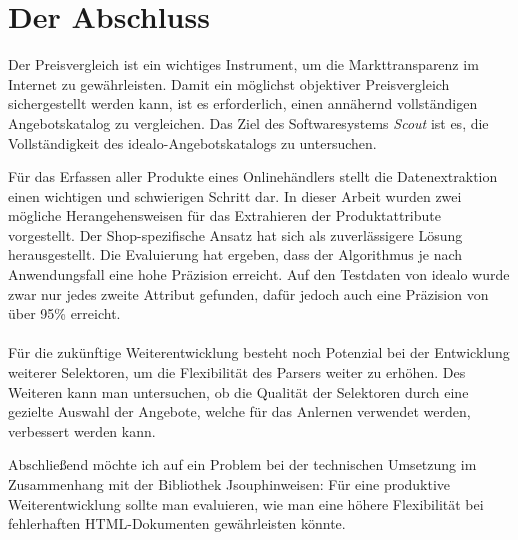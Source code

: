 \section{Der Abschluss}
\label{sec:abschluss}

Der Preisvergleich ist ein wichtiges Instrument, um die Markttransparenz im Internet zu gewährleisten.
Damit ein möglichst objektiver Preisvergleich sichergestellt werden kann, ist es erforderlich, einen annähernd
vollständigen Angebotskatalog zu vergleichen.
Das Ziel des Softwaresystems \textit{Scout} ist es, die Vollständigkeit des idealo-Angebotskatalogs zu untersuchen.

Für das Erfassen aller Produkte eines Onlinehändlers stellt die Datenextraktion einen wichtigen und schwierigen
Schritt dar.
In dieser Arbeit wurden zwei mögliche Herangehensweisen für das Extrahieren der Produktattribute vorgestellt.
Der Shop-spezifische Ansatz hat sich als zuverlässigere Lösung herausgestellt.
Die Evaluierung hat ergeben, dass der Algorithmus je nach Anwendungsfall eine hohe Präzision erreicht.
Auf den Testdaten von idealo wurde zwar nur jedes zweite Attribut gefunden, dafür jedoch auch eine Präzision von über
95\% erreicht.
\\
~\\
Für die zukünftige Weiterentwicklung besteht noch Potenzial bei der Entwicklung weiterer Selektoren, um die
Flexibilität des Parsers weiter zu erhöhen.
Des Weiteren kann man untersuchen, ob die Qualität der Selektoren durch eine gezielte Auswahl der Angebote, welche
für das Anlernen verwendet werden, verbessert werden kann.

Abschließend möchte ich auf ein Problem bei der technischen Umsetzung im Zusammenhang mit der Bibliothek
Jsoup\footnotemark hinweisen: Für eine produktive Weiterentwicklung sollte man evaluieren, wie man eine höhere
Flexibilität bei fehlerhaften HTML-Dokumenten gewährleisten könnte.
